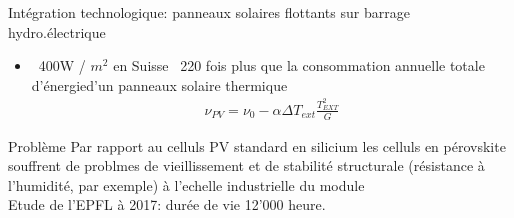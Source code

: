 \begin{parag}{Intégration technologique: panneaux solaires flottants sur barrage hydro.électrique}
	\begin{itemize}
		\item ~400W / $m^2$  en Suisse ~220 fois plus que la consommation annuelle totale d'énergie\Rendement d'un panneaux solaire thermique
			\begin{align*} \nu_{PV} =  \nu_0 - \alpha \Delta T_{ext} \frac{T_{EXT}^2}{G} \end{align*}
	\end{itemize}
	
    
\end{parag}
\begin{parag}{Problème}
    Par rapport au celluls PV standard en silicium les celluls en pérovskite souffrent de problmes de vieillissement et de stabilité structurale (résistance à l'humidité, par exemple) à l'echelle industrielle du module\\
    Etude de l'EPFL à 2017: durée  de vie 12'000 heure.
\end{parag}






